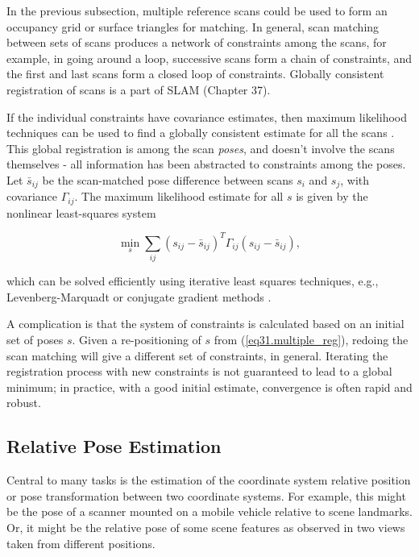 \documentclass[twocolumn,oneside]{book}
\begin{document}
In the previous subsection, multiple reference scans could be used to
form an occupancy grid or surface triangles for matching.  In general,
scan matching between sets of scans produces a network of constraints
among the scans, for example, in going around a loop, successive scans
form a chain of constraints, and the first and last scans form a
closed loop of constraints.  Globally consistent registration of scans
is a part of SLAM (Chapter 37).

If the individual constraints have covariance estimates, then maximum
likelihood techniques can be used to find a globally consistent
estimate for all the scans \cite{lu97}.  This global registration
is among the scan {\em poses}, and doesn't involve the scans
themselves - all information has been abstracted to constraints among
the poses.  Let $\bar{s}_{ij}$ be the scan-matched pose difference
between scans $s_i$ and $s_j$, with covariance $\Gamma_{ij}$.  The
maximum likelihood estimate for all $s$ is given by the nonlinear
least-squares system

\begin{equation}
\min_s \sum_{ij} (s_{ij}-\bar{s}_{ij})^T \Gamma_{ij} (s_{ij}-\bar{s}_{ij}),
\label{eq31.multiple_reg}
\end{equation}

\noindent which can be solved efficiently using iterative least
squares techniques, e.g., Levenberg-Marquadt or conjugate gradient
methods \cite{konolige04,kelly03}.

A complication is that the system of constraints is calculated based
on an initial set of poses $s$.  Given a re-positioning of $s$ from
(\ref{eq31.multiple_reg}), redoing the scan matching will give a
different set of constraints, in general.  Iterating the registration
process with new constraints is not guaranteed to lead to a global
minimum; in practice, with a good initial estimate, convergence is
often rapid and robust.


\subsection{Relative Pose Estimation\label{pose23}} 

Central to many tasks is the estimation of the coordinate system
relative position or pose transformation between two coordinate systems.
For example, this might be the pose of a scanner mounted on
a mobile vehicle relative to scene landmarks.
Or, it might be the relative pose of some scene features as observed in
two views taken from different positions.
\end{document}
